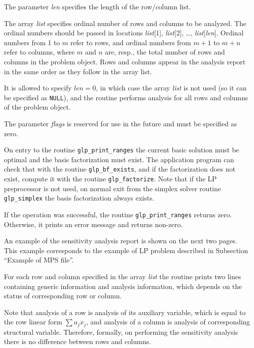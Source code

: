 The parameter {\it len} specifies the length of the row/column list.

The array {\it list} specifies ordinal number of rows and columns to be
analyzed. The ordinal numbers should be passed in locations
{\it list}[1], {\it list}[2], \dots, {\it list}[{\it len}]. Ordinal
numbers from 1 to $m$ refer to rows, and ordinal numbers from $m+1$ to
$m+n$ refer to columns, where $m$ and $n$ are, resp., the total number
of rows and columns in the problem object. Rows and columns appear in
the analysis report in the same order as they follow in the array list.

It is allowed to specify $len=0$, in which case the array {\it list} is
not used (so it can be specified as \verb|NULL|), and the routine
performs analysis for all rows and columns of the problem object.

The parameter {\it flags} is reserved for use in the future and must be
specified as zero.

On entry to the routine \verb|glp_print_ranges| the current basic
solution must be optimal and the basis factorization must exist.
The application program can check that with the routine
\verb|glp_bf_exists|, and if the factorization does
not exist, compute it with the routine \verb|glp_factorize|. Note that
if the LP preprocessor is not used, on normal exit from the simplex
solver routine \verb|glp_simplex| the basis factorization always exists.

\returns

If the operation was successful, the routine \verb|glp_print_ranges|
returns zero. Otherwise, it prints an error message and returns
non-zero.


An example of the sensitivity analysis report is shown on the next two
pages. This example corresponds to the example of LP problem described
in Subsection ``Example of MPS file''.


For each row and column specified in the array {\it list} the routine
prints two lines containing generic information and analysis
information, which depends on the status of corresponding row or column.

Note that analysis of a row is analysis of its auxiliary variable,
which is equal to the row linear form $\sum a_jx_j$, and analysis of
a column is analysis of corresponding structural variable. Therefore,
formally, on performing the sensitivity analysis there is no difference
between rows and columns.

